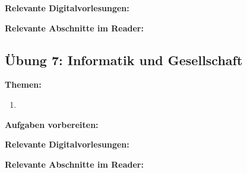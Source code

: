 \documentclass[a4paper]{article}%
\begin{document}
\bigskip


\textbf{Relevante Digitalvorlesungen:}

\bigskip

\textbf{Relevante Abschnitte im Reader:}


\clearpage




\clearpage
\subsection{Übung 7: Informatik und Gesellschaft}


\textbf{Themen:}
\begin{enumerate}
\item        %
\end{enumerate}

\bigskip

\textbf{Aufgaben vorbereiten:}

\bigskip


\textbf{Relevante Digitalvorlesungen:}

\bigskip

\textbf{Relevante Abschnitte im Reader:}
\end{document}
